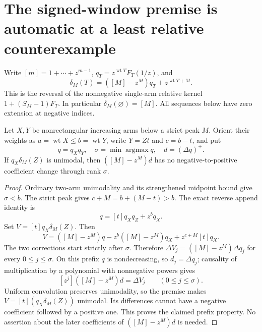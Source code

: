 \section{The signed-window premise is automatic at a least relative counterexample}
Write $[m]=1+\cdots+z^{m-1}$, $q_T=z^{\operatorname{wt}T}F_T(1/z)$,
and
\[
 \delta_M(T)=([M]-z^M)q_T+z^{\operatorname{wt}T+M}.
\]
This is the reversal of the nonnegative single-arm relative kernel
$1+(S_M-1)F_T$. In particular $\delta_M(\varnothing)=[M]$.
All sequences below have zero extension at negative indices.

\begin{lemma}
Let $X,Y$ be nonrectangular increasing arms below a strict peak $M$.
Orient their weights as $a=\operatorname{wt}X\le b=\operatorname{wt}Y$,
write $Y=Zt$ and $c=b-t$, and put
\[
 q=q_Xq_Y,\quad \sigma=\min\operatorname{argmax}q,
 \quad d=(\Delta q)^+.
\]
If $q_X\delta_M(Z)$ is unimodal, then $([M]-z^M)d$
has no negative-to-positive coefficient change through rank $\sigma$.
\end{lemma}
\begin{proof}
Ordinary two-arm unimodality and its strengthened midpoint bound
give $\sigma<b$. The strict peak gives $c+M=b+(M-t)>b$.
The exact reverse append identity is
\[
 q=[t]q_Xq_Z+z^bq_X.
\]
Set $V=[t]q_X\delta_M(Z)$. Then
\[
 V=([M]-z^M)q-z^b([M]-z^M)q_X
                      +z^{c+M}[t]q_X.
\]
The two corrections start strictly after $\sigma$. Therefore
$\Delta V_j=([M]-z^M)\Delta q_j$ for every $0\le j\le\sigma$.
On this prefix $q$ is nondecreasing, so $d_j=\Delta q_j$;
causality of multiplication by a polynomial with nonnegative powers
gives
\[
                 [z^j]([M]-z^M)d=\Delta V_j
                       \qquad(0\le j\le\sigma).
\]
Uniform convolution preserves unimodality, so the premise makes
$V=[t](q_X\delta_M(Z))$ unimodal. Its differences cannot have
a negative coefficient followed by a positive one. This proves
the claimed prefix property. No assertion about the later
coefficients of $([M]-z^M)d$ is needed.
\end{proof}

